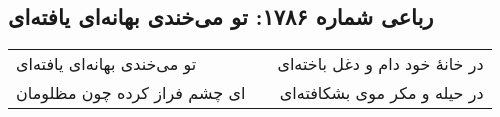 \begin{center}
\section*{رباعی شماره ۱۷۸۶: تو می‌خندی بهانه‌ای یافته‌ای}
\label{sec:1786}
\begin{longtable}{l p{0.5cm} r}
تو می‌خندی بهانه‌ای یافته‌ای
&&
در خانهٔ خود دام و دغل باخته‌ای
\\
ای چشم فراز کرده چون مظلومان
&&
در حیله و مکر موی بشکافته‌ای
\\
\end{longtable}
\end{center}
